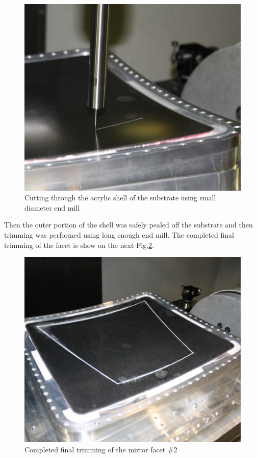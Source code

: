 \begin{figure}[h]
    \centering
    \includegraphics[width=1.0\linewidth]{images/Trimming_1}
    \caption{Cutting through the acrylic shell of the substrate using small diameter end mill}
    \label{fig:Trimming_1}
\end{figure}

Then the outer portion of the shell was safely pealed off the substrate and then trimming was performed using long enough end mill. The completed final trimming of the facet is show on the next Fig.\ref{fig:Trimming_2}.

\begin{figure}[h]
    \centering
    \includegraphics[width=1.0\linewidth]{images/Trimming_2}
    \caption{Completed final trimming of the mirror facet \#2}
    \label{fig:Trimming_2}
\end{figure}

